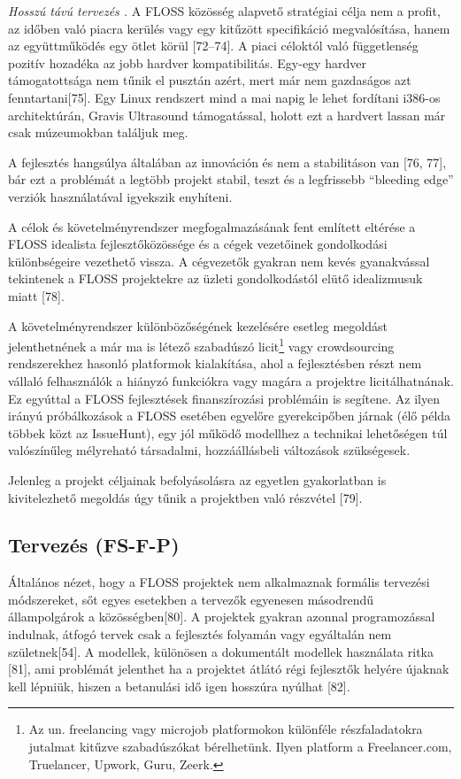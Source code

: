 \documentclass[12pt,magyar,a4paper,oneside]{scrreprt}
\begin{document}
\emph{Hosszú távú tervezés .} A FLOSS közösség alapvető stratégiai célja
nem a profit, az időben való piacra kerülés vagy egy kitűzött
specifikáció megvalósítása, hanem az együttműködés egy ötlet körül
{[}72--74{]}. A piaci céloktól való függetlenség pozitív hozadéka az
jobb hardver kompatibilitás. Egy-egy hardver támogatottsága nem tűnik el
pusztán azért, mert már nem gazdaságos azt fenntartani{[}75{]}. Egy
Linux rendszert mind a mai napig le lehet fordítani i386-os
architektúrán, Gravis Ultrasound támogatással, holott ezt a hardvert
lassan már csak múzeumokban találjuk meg.

A fejlesztés hangsúlya általában az innováción és nem a stabilitáson van
{[}76, 77{]}, bár ezt a problémát a legtöbb projekt stabil, teszt és a
legfrissebb ``bleeding edge'' verziók használatával igyekszik enyhíteni.

A célok és követelményrendszer megfogalmazásának fent említett eltérése
a FLOSS idealista fejlesztőközössége és a cégek vezetőinek gondolkodási
különbségeire vezethető vissza. A cégvezetők gyakran nem kevés
gyanakvással tekintenek a FLOSS projektekre az üzleti gondolkodástól
elütő idealizmusuk miatt {[}78{]}.

A követelményrendszer különbözőségének kezelésére esetleg megoldást
jelenthetnének a már ma is létező szabadúszó licit\footnote{Az un.
  freelancing vagy microjob platformokon különféle részfaladatokra
  jutalmat kitűzve szabadúszókat bérelhetünk. Ilyen platform a
  Freelancer.com, Truelancer, Upwork, Guru, Zeerk.} vagy crowdsourcing
rendszerekhez hasonló platformok kialakítása, ahol a fejlesztésben részt
nem vállaló felhasználók a hiányzó funkciókra vagy magára a projektre
licitálhatnának. Ez egyúttal a FLOSS fejlesztések finanszírozási
problémáin is segítene. Az ilyen irányú próbálkozások a FLOSS esetében
egyelőre gyerekcipőben járnak (élő példa többek közt az IssueHunt), egy
jól működő modellhez a technikai lehetőségen túl valószínűleg mélyreható
társadalmi, hozzáállásbeli változások szükségesek.

Jelenleg a projekt céljainak befolyásolásra az egyetlen gyakorlatban is
kivitelezhető megoldás úgy tűnik a projektben való részvétel {[}79{]}.

\hypertarget{sec:FS-F-P}{%
\subsection{Tervezés (FS-F-P)}\label{sec:FS-F-P}}

Általános nézet, hogy a FLOSS projektek nem alkalmaznak formális
tervezési módszereket, sőt egyes esetekben a tervezők egyenesen
másodrendű állampolgárok a közösségben{[}80{]}. A projektek gyakran
azonnal programozással indulnak, átfogó tervek csak a fejlesztés
folyamán vagy egyáltalán nem születnek{[}54{]}. A modellek, különösen a
dokumentált modellek használata ritka {[}81{]}, ami problémát jelenthet
ha a projektet átlátó régi fejlesztők helyére újaknak kell lépniük,
hiszen a betanulási idő igen hosszúra nyúlhat {[}82{]}.
\end{document}
